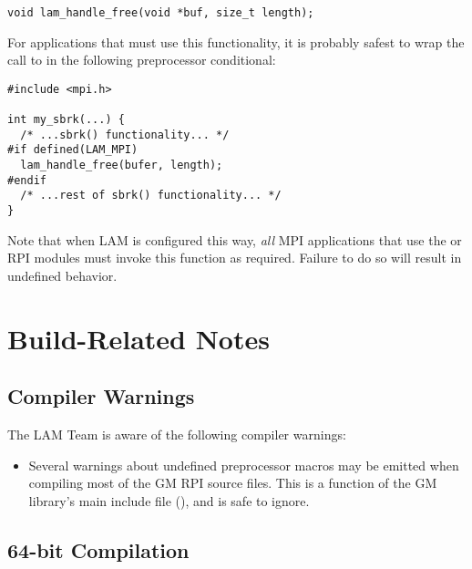 \lstset{style=lam-c}
\begin{lstlisting}
void lam_handle_free(void *buf, size_t length);
\end{lstlisting}

For applications that must use this functionality, it is probably
safest to wrap the call to  in the
following preprocessor conditional:

\lstset{style=lam-c}
\begin{lstlisting}
#include <mpi.h>

int my_sbrk(...) {
  /* ...sbrk() functionality... */
#if defined(LAM_MPI)
  lam_handle_free(bufer, length);
#endif
  /* ...rest of sbrk() functionality... */
}
\end{lstlisting}

Note that when LAM is configured this way, {\em all} MPI applications
that use the  or  RPI modules must invoke this
function as required.  Failure to do so will result in undefined
behavior. 




\section{Build-Related Notes}



\subsection{Compiler Warnings}

The LAM Team is aware of the following compiler warnings:

\begin{itemize}
\item Several warnings about undefined preprocessor macros may be
  emitted when compiling most of the GM RPI source files.  This is a
  function of the GM library's main include file (), and is
  safe to ignore.
\end{itemize}


\subsection{64-bit Compilation}

